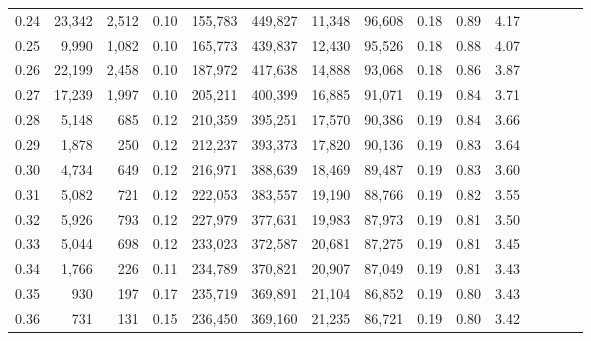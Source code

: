 \begin{tabular}{rrrcrrrrrrrrrrr}
0.24 &  23,342 &  2,512 &                                       0.10 &  155,783 &  449,827 &   11,348 &   96,608 &  0.18 &  0.89 &                         4.17 \\
0.25 &   9,990 &  1,082 &                                       0.10 &  165,773 &  439,837 &   12,430 &   95,526 &  0.18 &  0.88 &                         4.07 \\
0.26 &  22,199 &  2,458 &                                       0.10 &  187,972 &  417,638 &   14,888 &   93,068 &  0.18 &  0.86 &                         3.87 \\
0.27 &  17,239 &  1,997 &                                       0.10 &  205,211 &  400,399 &   16,885 &   91,071 &  0.19 &  0.84 &                         3.71 \\
0.28 &   5,148 &    685 &                                       0.12 &  210,359 &  395,251 &   17,570 &   90,386 &  0.19 &  0.84 &                         3.66 \\
0.29 &   1,878 &    250 &                                       0.12 &  212,237 &  393,373 &   17,820 &   90,136 &  0.19 &  0.83 &                         3.64 \\
0.30 &   4,734 &    649 &                                       0.12 &  216,971 &  388,639 &   18,469 &   89,487 &  0.19 &  0.83 &                         3.60 \\
0.31 &   5,082 &    721 &                                       0.12 &  222,053 &  383,557 &   19,190 &   88,766 &  0.19 &  0.82 &                         3.55 \\
0.32 &   5,926 &    793 &                                       0.12 &  227,979 &  377,631 &   19,983 &   87,973 &  0.19 &  0.81 &                         3.50 \\
0.33 &   5,044 &    698 &                                       0.12 &  233,023 &  372,587 &   20,681 &   87,275 &  0.19 &  0.81 &                         3.45 \\
0.34 &   1,766 &    226 &                                       0.11 &  234,789 &  370,821 &   20,907 &   87,049 &  0.19 &  0.81 &                         3.43 \\
0.35 &     930 &    197 &                                       0.17 &  235,719 &  369,891 &   21,104 &   86,852 &  0.19 &  0.80 &                         3.43 \\
0.36 &     731 &    131 &                                       0.15 &  236,450 &  369,160 &   21,235 &   86,721 &  0.19 &  0.80 &                         3.42 \\

\end{tabular}
